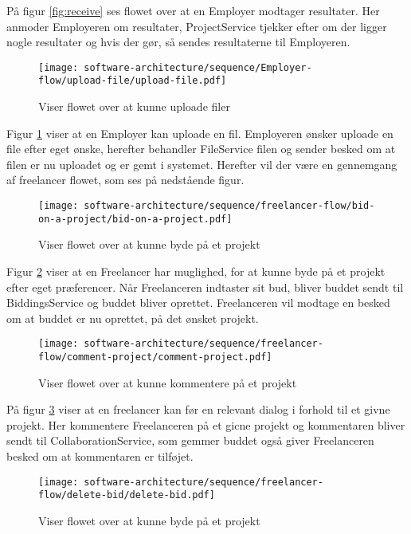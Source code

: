 På figur \ref{fig:receive} ses flowet over at en Employer modtager resultater. Her anmoder Employeren om resultater, ProjectService tjekker efter om der ligger nogle resultater og hvis der gør, så sendes resultaterne til Employeren.

\begin{figure}[H]
    \centering
\texttt{[image: software-architecture/sequence/Employer-flow/upload-file/upload-file.pdf]}
\caption{Viser flowet over at kunne uploade filer}
\label{fig:uploade}
\end{figure}
Figur \ref{fig:uploade} viser at en Employer kan uploade en fil. Employeren ønsker uploade en file efter eget ønske, herefter behandler FileService filen og sender besked om at filen er nu uploadet og er gemt i systemet. Herefter vil der være en gennemgang af freelancer flowet, som ses på nedstående figur.

\begin{figure}[H]
    \centering
\texttt{[image: software-architecture/sequence/freelancer-flow/bid-on-a-project/bid-on-a-project.pdf]}
\caption{Viser flowet over at kunne byde på et projekt}
\label{fig:Bid}
\end{figure}

Figur \ref{fig:Bid} viser at en Freelancer har muglighed, for at kunne byde på et projekt efter eget præferencer. Når Freelanceren indtaster sit bud, bliver buddet sendt til BiddingsService og buddet bliver oprettet. Freelanceren vil modtage en besked om at buddet er nu oprettet, på det ønsket projekt.  


\begin{figure}[H]
    \centering
\texttt{[image: software-architecture/sequence/freelancer-flow/comment-project/comment-project.pdf]}
\caption{Viser flowet over at kunne kommentere på et projekt}
\label{fig:comment}
\end{figure}
På figur \ref{fig:comment} viser at en freelancer kan før en relevant dialog i forhold til et givne projekt. Her kommentere Freelanceren på et gicne projekt og kommentaren bliver sendt til CollaborationService, som gemmer buddet også giver Freelanceren besked om at kommentaren er tilføjet. 

\begin{figure}[H]
    \centering
\texttt{[image: software-architecture/sequence/freelancer-flow/delete-bid/delete-bid.pdf]}
\caption{Viser flowet over at kunne byde på et projekt}
\label{fig:deleteBid}
\end{figure}

